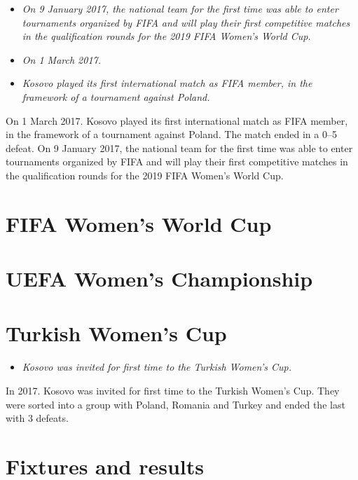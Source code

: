 \begin{itemize}
\item
  \emph{On 9 January 2017, the national team for the first time was able
  to enter tournaments organized by FIFA and will play their first
  competitive matches in the qualification rounds for the 2019 FIFA
  Women's World Cup.}
\item
  \emph{On 1 March 2017.}
\item
  \emph{Kosovo played its first international match as FIFA member, in
  the framework of a tournament against Poland.}
\end{itemize}

On 1 March 2017. Kosovo played its first international match as FIFA
member, in the framework of a tournament against Poland. The match ended
in a 0--5 defeat. On 9 January 2017, the national team for the first
time was able to enter tournaments organized by FIFA and will play their
first competitive matches in the qualification rounds for the 2019 FIFA
Women's World Cup.

\section{FIFA Women's World Cup}\label{fifa-womens-world-cup}

\section{UEFA Women's Championship}\label{uefa-womens-championship}

\section{Turkish Women's Cup}\label{turkish-womens-cup}

\begin{itemize}
\item
  \emph{Kosovo was invited for first time to the Turkish Women's Cup.}
\end{itemize}

In 2017. Kosovo was invited for first time to the Turkish Women's Cup.
They were sorted into a group with Poland, Romania and Turkey and ended
the last with 3 defeats.

\section{Fixtures and results}\label{fixtures-and-results}

